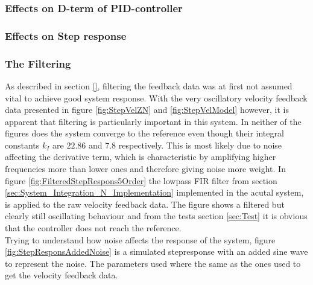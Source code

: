 \documentclass[../../main.tex]{subfiles}
\begin{document}
\subsubsection*{Effects on D-term of PID-controller}

\subsubsection*{Effects on Step response}

\subsubsection*{The Filtering}
As described in section \ref{}, filtering the feedback data was at first not assumed vital to achieve good system response. With the very oscillatory velocity feedback data presented in figure \ref{fig:StepVelZN} and \ref{fig:StepVelModel} however, it is apparent that filtering is particularly important in this system. In neither of the figures does the system converge to the reference even though their integral constants $k_I$ are $22.86$ and $7.8$ respectively. This is most likely due to noise affecting the derivative term, which is characteristic by amplifying higher frequencies more than lower ones and therefore giving noise more weight. In figure \ref{fig:FilteredStepRespons5Order} the lowpass FIR filter from section \ref{sec:System_Integration_N_Implementation} implemented in the acutal system, is applied to the raw velocity feedback data. The figure shows a filtered but clearly still oscillating behaviour and from the tests section \ref{sec:Test} it is obvious that the controller does not reach the reference.\\

Trying to understand how noise affects the response of the system, figure  \ref{fig:StepResponsAddedNoise} is a simulated stepresponse with an added sine wave to represent the noise. The parameters used where the same as the ones used to get the velocity feedback data. 
\end{document}
